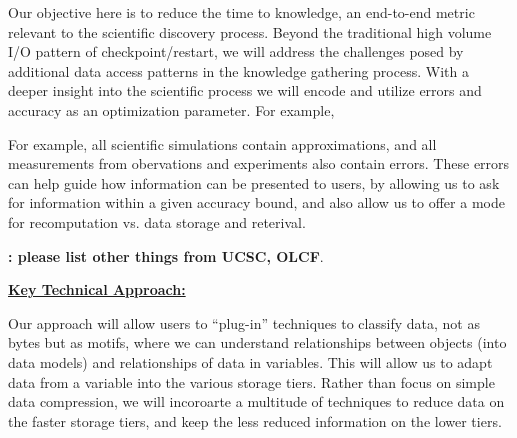 \documentclass[11pt,letterpaper]{article}
\begin{document}

%

%
Our objective here is to reduce the time to knowledge, an end-to-end metric
relevant to the scientific discovery process. Beyond the traditional high
volume I/O pattern of checkpoint/restart, we will address the challenges
posed by additional data access patterns in the knowledge gathering
process. With a deeper insight into the scientific process we will encode
and utilize errors and accuracy as an optimization parameter. For example, 
%

For example, all scientific simulations contain
approximations, and all measurements from obervations and experiments also
contain errors. These errors can help guide how information can be presented
to users, by allowing us to ask for information within a given accuracy
bound, and also allow us to offer a mode for recomputation vs. data storage
and reterival.

%
{\bf: please list other things from UCSC, OLCF}.
%


\underline{\textbf{Key Technical Approach:}}

Our approach will allow users to ``plug-in'' techniques to classify data, not as bytes but as motifs, where
we can understand relationships between objects (into data models) and relationships of data in variables.
This will allow us to adapt data from a variable into the various storage tiers. Rather than focus on simple data
compression, we will incoroarte a multitude of techniques to reduce data on the faster storage tiers, and keep the less
reduced information on the lower tiers.
\end{document}
